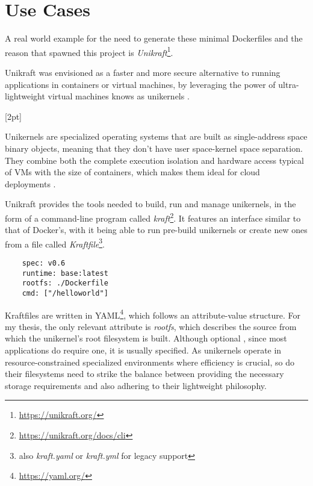\chapter{Use Cases}
\label{chapter:use-cases}

A real world example for the need to generate these minimal Dockerfiles and
the reason that spawned this project is \textit{Unikraft}\footnote[1]{\url{https://unikraft.org/}}.

Unikraft was envisioned as a faster and more secure alternative to running applications in containers or virtual machines, by
leveraging the power of ultra-lightweight virtual machines knows as unikernels \cite{unikraft}.

[2pt]

Unikernels are specialized operating systems that are built as single-address space binary objects, meaning that they don't 
have user space-kernel space separation. They combine both the complete execution isolation and hardware access typical of VMs with the size of containers,
which makes them ideal for cloud deployments  \cite{unikraft}.

Unikraft provides the tools needed to build, run and manage unikernels, in the form of a command-line program called \textit{kraft}\footnote{\url{https://unikraft.org/docs/cli}}.
It features an interface similar to that of Docker's, with it being able to run pre-build unikernels or create new ones from a file called \textit{Kraftfile}\footnote{also \textit{kraft.yaml} or \textit{kraft.yml} for legacy support}.

\lstset{language=yaml,caption=Sample Kraftfile,label=lst:ex-kraftfile}
\begin{lstlisting}
    spec: v0.6
    runtime: base:latest
    rootfs: ./Dockerfile
    cmd: ["/helloworld"]  
\end{lstlisting}

Kraftfiles are written in YAML\footnote{\url{https://yaml.org/}}, which follows an attribute-value structure. For my thesis, the only relevant attribute is \textit{rootfs}, which
describes the source from which the unikernel's root filesystem is built. Although optional \cite{unikraft-filesystem}, since most applications do require one, it is usually specified.
As unikernels operate in resource-constrained specialized environments where efficiency is crucial, so do their filesystems need to strike the balance between
providing the necessary storage requirements and also adhering to their lightweight philosophy.

